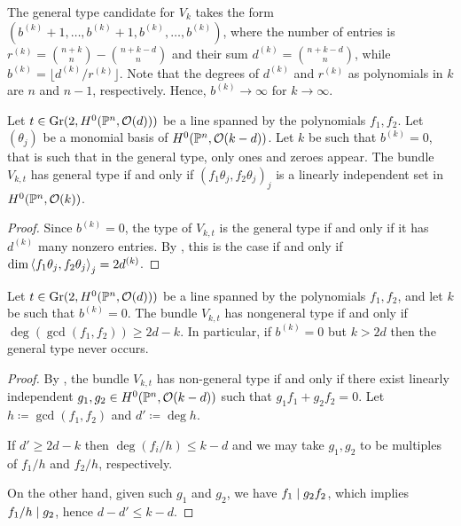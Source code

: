 \begin{remark}
	The general type candidate for $V_k$ takes the form
	$(b^{(k)}+1,\dotsc,b^{(k)}+1,b^{(k)},\dotsc,b^{(k)})$,
	where the number of entries is
	$r^{(k)} = \binom{n+k}{n} - \binom{n+k-d}{n}$
	and their sum $d^{(k)} = \binom{n+k-d}{n}$, while
	$b^{(k)} = \lfloor d^{(k)}/r^{(k)}\rfloor$.
	Note that the degrees of $d^{(k)}$ and $r^{(k)}$ as polynomials in $k$ are $n$ and $n-1$, respectively. Hence, $b^{(k)} \to \infty$ for $k \to \infty$.
\end{remark}

\begin{corollary} \label{no-more-than-ones}
	Let $t\in \operatorname{Gr}(2,H^0(\mathbb{P}^n, \mathcal{O}(d)))$ be a line spanned by the polynomials $f_1,f_2$. Let $(\theta_j)$ be a monomial basis of $H^0(\mathbb{P}^n, \mathcal{O}(k-d))$. Let $k$ be such that $b^{(k)}=0$, that is such that in the general type, only ones and zeroes appear. The bundle $V_{k,t}$ has general type if and only if
	$(f_1\theta_j,f_2\theta_j)_j$ is a linearly independent set in $H^0(\mathbb{P}^n,\mathcal{O}(k))$.
\end{corollary}

\begin{proof}
  Since $b^{(k)}=0$, the type of $V_{k,t}$ is the general type if and only if it has $d^{(k)}$ many nonzero entries.
	By , this is the case if and only if $\dim\left\langle f_1 \theta_j, f_2 \theta_j \right\rangle_j = 2 d^{(k)}$.
\end{proof}

\begin{proposition} \label{nongeneral-type-shared-sections}
	Let $t\in \operatorname{Gr}(2,H^0(\mathbb{P}^n, \mathcal{O}(d)))$ be a line spanned by the polynomials $f_1,f_2$, and let $k$ be such that $b^{(k)}=0$. The bundle $V_{k,t}$ has nongeneral type if and only if $\deg(\gcd(f_1,f_2)) \geq 2d-k$. In particular, if $b^{(k)}=0$ but $k>2d$ then the general type never occurs.
\end{proposition}

\begin{proof}
	By , the bundle $V_{k,t}$ has non-general type if and only if there exist linearly independent $g_1,g_2\in H^0(\mathbb{P}^n,\mathcal{O}(k-d))$ such that $g_1f_1+g_2f_2 = 0$. Let $h \coloneqq \gcd(f_1,f_2)$ and $d'\coloneqq \deg h$.

	If $d' \geq 2d-k$ then $\deg (f_i/h) \leq k-d$ and we may take $g_1,g_2$ to be multiples of $f_1/h$ and $f_2/h$, respectively.

	On the other hand, given such $g_1$ and $g_2$, we have $f_1\mid g_2 f_2$, which implies $f_1/h \mid g_2$, hence $d-d'\leq k-d$.
\end{proof}

